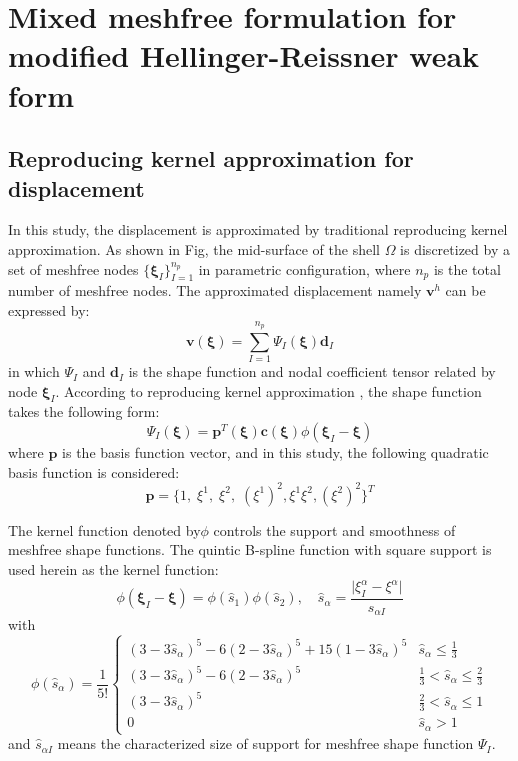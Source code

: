 \section{Mixed meshfree formulation for modified Hellinger-Reissner weak form}\label{mixed}
\subsection{Reproducing kernel approximation for displacement}
In this study, the displacement is approximated by traditional reproducing kernel approximation. As shown in Fig, the mid-surface of the shell $\Omega$ is discretized by a set of meshfree nodes $\{\boldsymbol \xi_I\}_{I=1}^{n_p}$ in parametric configuration, where $n_p$ is the total number of meshfree nodes. The approximated displacement namely $\boldsymbol v^h$ can be expressed by:
\begin{equation}\label{approxv}
\boldsymbol v(\boldsymbol \xi) = \sum_{I=1}^{n_p} \Psi_I(\boldsymbol \xi) \boldsymbol d_I
\end{equation}
in which $\Psi_I$ and $\boldsymbol d_I$ is the shape function and nodal coefficient tensor related by node $\boldsymbol \xi_I$. According to reproducing kernel approximation \cite{liu1995}, the shape function takes the following form:
\begin{equation}
\Psi_I(\boldsymbol \xi) = \boldsymbol p^T(\boldsymbol \xi) \boldsymbol c(\boldsymbol \xi) \phi(\boldsymbol \xi_I - \boldsymbol \xi)
\end{equation}
where $\boldsymbol p$ is the basis function vector, and in this study, the following quadratic basis function is considered:
\begin{equation}
        \boldsymbol p = \{1,\;\xi^1,\;\xi^2,\;(\xi^1)^2,\xi^1\xi^2,(\xi^2)^2\}^T
\end{equation}

The kernel function denoted by$\phi$ controls the support and smoothness of meshfree shape functions. The quintic B-spline function with square support is used herein as the kernel function:
\begin{equation}
\phi(\boldsymbol \xi_I - \boldsymbol \xi) = \phi(\hat s_1)\phi(\hat s_2), \quad \hat s_\alpha = \frac{\vert \xi^\alpha_I - \xi^\alpha\vert}{s_{\alpha I}}
\end{equation}
with
\begin{equation}
\phi(\hat s_\alpha) = \frac{1}{5!}\begin{cases}
(3-3\hat s_\alpha)^5 - 6(2-3\hat s_\alpha)^5 + 15(1-3\hat s_\alpha)^5 & \hat s_\alpha \le \frac{1}{3} \\
(3-3\hat s_\alpha)^5 - 6(2-3\hat s_\alpha)^5 & \frac{1}{3}<\hat s_\alpha \le \frac{2}{3} \\
(3-3\hat s_\alpha)^5 & \frac{2}{3}<\hat s_\alpha \le 1 \\
0 & \hat s_\alpha >1
\end{cases}
\end{equation}
and $\hat s_{\alpha I}$ means the characterized size of support for meshfree shape function $\Psi_I$.

